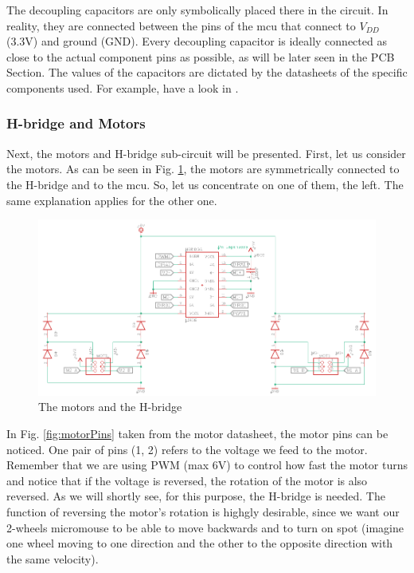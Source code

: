 The decoupling capacitors are only symbolically placed there in the circuit. In reality, they are connected between the pins of the mcu that connect to $V_{DD}$ (3.3V) and ground (GND). Every decoupling capacitor is ideally connected as close to the actual component pins as possible, as will be later seen in the PCB Section. The values of the capacitors are dictated by the datasheets of the specific components used. For example, have a look in \cite{mcu}.

\vspace{1cm}


\subsubsection{H-bridge and Motors}

Next, the motors and H-bridge sub-circuit will be presented. 
First, let us consider the motors. As can be seen in Fig. \ref{fig:motors}, the motors are symmetrically connected to the H-bridge and to the mcu. So, let us concentrate on one of them, the left. The same explanation applies for the other one.

\begin{figure}[htb]
    \centering
    \includegraphics[width=1\textwidth]{figures/hardware/Motors.PNG}
    \caption{The motors and the H-bridge}
    \label{fig:motors}
\end{figure}

\FloatBarrier
\noindent
In Fig. \ref{fig:motorPins} taken from the motor datasheet, the motor pins can be noticed. 
One pair of pins (1, 2) refers to the voltage we feed to the motor. Remember that we are using PWM (max 6V) to control how fast the motor turns and notice that if the voltage is reversed, the rotation of the motor is also reversed. As we will shortly see, for this purpose, the H-bridge is needed. The function of reversing the motor's rotation is highgly desirable, since we want our 2-wheels micromouse to be able to move backwards and to turn on spot (imagine one wheel moving to one direction and the other to the opposite direction with the same velocity).

